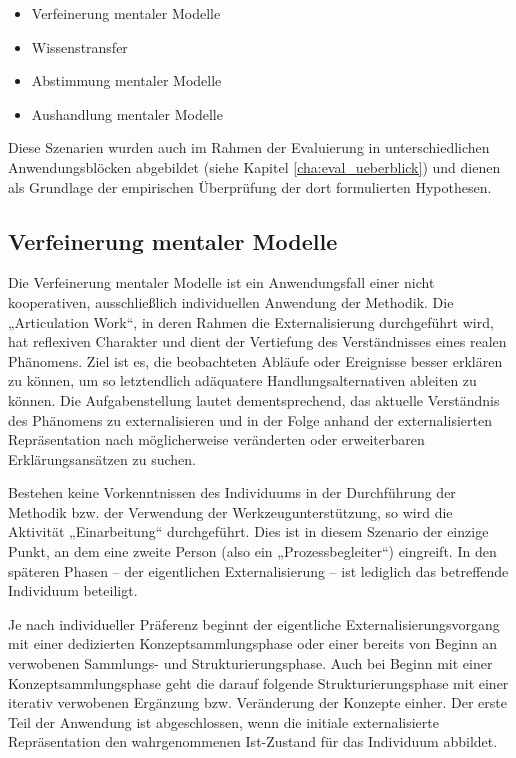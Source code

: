 \begin{itemize}
 \item Verfeinerung mentaler Modelle
 \item Wissenstransfer
 \item Abstimmung mentaler Modelle 
 \item Aushandlung mentaler Modelle
\end{itemize}

Diese Szenarien wurden auch im Rahmen der Evaluierung in unterschiedlichen Anwendungsblöcken abgebildet (siehe Kapitel \ref{cha:eval_ueberblick}) und dienen als Grundlage der empirischen Überprüfung der dort formulierten Hypothesen.

\subsection{Verfeinerung mentaler Modelle} %
\label{sub:verfeinerung_individueller_mentaler_modelle}

Die Verfeinerung mentaler Modelle ist ein Anwendungsfall einer nicht kooperativen, ausschließlich individuellen Anwendung der Methodik. Die „Articulation Work“, in deren Rahmen die Externalisierung durchgeführt wird, hat reflexiven Charakter und dient der Vertiefung des Verständnisses eines realen Phänomens. Ziel ist es, die beobachteten Abläufe oder Ereignisse besser erklären zu können, um so letztendlich adäquatere Handlungsalternativen ableiten zu können. Die Aufgabenstellung lautet dementsprechend, das aktuelle Verständnis des Phänomens zu externalisieren und in der Folge anhand der externalisierten Repräsentation nach möglicherweise veränderten oder erweiterbaren Erklärungsansätzen zu suchen.

Bestehen keine Vorkenntnissen des Individuums in der Durchführung der Methodik bzw. der Verwendung der Werkzeugunterstützung, so wird die Aktivität „Einarbeitung“ durchgeführt. Dies ist in diesem Szenario der einzige Punkt, an dem eine zweite Person (also ein „Prozessbegleiter“) eingreift. In den späteren Phasen -- der eigentlichen Externalisierung -- ist lediglich das betreffende Individuum beteiligt.

Je nach individueller Präferenz beginnt der eigentliche Externalisierungsvorgang mit einer dedizierten Konzeptsammlungsphase oder einer bereits von Beginn an verwobenen Sammlungs- und Strukturierungsphase. Auch bei Beginn mit einer Konzeptsammlungsphase geht die darauf folgende Strukturierungsphase mit einer iterativ verwobenen Ergänzung bzw. Veränderung der Konzepte einher. Der erste Teil der Anwendung ist abgeschlossen, wenn die initiale externalisierte Repräsentation den wahrgenommenen Ist-Zustand für das Individuum abbildet.

